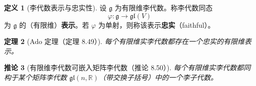 \documentclass[11pt,a4paper]{article}
\newcommand{\R}{\mathbb{R}}
\newcommand{\gl}{\mathfrak{gl}}
\theoremstyle{definition}
\newtheorem{definition}{定义}[section]
\theoremstyle{plain}
\newtheorem{theorem}[definition]{定理}
\newtheorem{corollary}[definition]{推论}
\begin{document}
\begin{definition}[李代数表示与忠实性]
设 $\mathfrak g$ 为有限维李代数。称李代数同态
\[
\varphi:\mathfrak g\to\gl(V)
\]
为 $\mathfrak g$ 的（有限维）\textbf{表示}。若 $\varphi$ 为单射，则称该表示\textbf{忠实}（faithful）。
\end{definition}

\begin{theorem}[Ado 定理（定理 8.49）]
每个有限维实李代数都存在一个忠实的有限维表示。
\end{theorem}

\begin{corollary}[有限维李代数可嵌入矩阵李代数（推论 8.50）]
每个有限维实李代数都同构于某个矩阵李代数 $\gl(n,\R)$（带交换子括号）中的一个李子代数。
\end{corollary}
\end{document}
